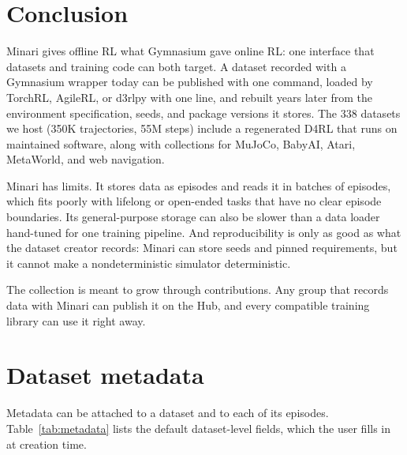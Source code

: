 \documentclass{article}
\newcommand{\numdatasets}{338\xspace}
\newcommand{\numtrajectories}{350K\xspace}
\newcommand{\numsteps}{55M\xspace}
\begin{document}
\section{Conclusion}
Minari gives offline RL what Gymnasium gave online RL: one interface that datasets and training code can both target. A dataset recorded with a Gymnasium wrapper today can be published with one command, loaded by TorchRL, AgileRL, or d3rlpy with one line, and rebuilt years later from the environment specification, seeds, and package versions it stores. The \numdatasets datasets we host (\numtrajectories trajectories, \numsteps steps) include a regenerated D4RL that runs on maintained software, along with collections for MuJoCo, BabyAI, Atari, MetaWorld, and web navigation.

Minari has limits. It stores data as episodes and reads it in batches of episodes, which fits poorly with lifelong or open-ended tasks that have no clear episode boundaries. Its general-purpose storage can also be slower than a data loader hand-tuned for one training pipeline. And reproducibility is only as good as what the dataset creator records: Minari can store seeds and pinned requirements, but it cannot make a nondeterministic simulator deterministic.

The collection is meant to grow through contributions. Any group that records data with Minari can publish it on the Hub, and every compatible training library can use it right away.


\appendix


\section{Dataset metadata}
\label{app:metadata}

Metadata can be attached to a dataset and to each of its episodes. Table~\ref{tab:metadata} lists the default dataset-level fields, which the user fills in at creation time.
\end{document}
